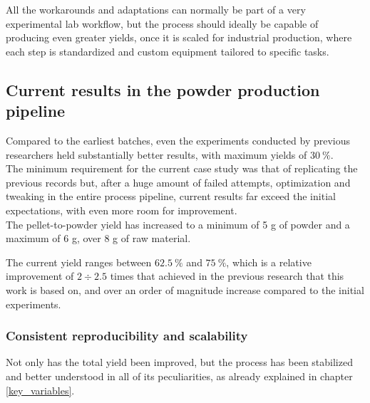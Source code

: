 \documentclass{article}
\begin{document}
        
        All the workarounds and adaptations can normally be part of a very experimental lab workflow, but the process should ideally 
        be capable of producing even greater yields, once it is scaled for industrial production, where each step is standardized 
        and custom equipment tailored to specific tasks. 

        \clearpage

        \subsection{Current results in the powder production pipeline \label{promising_results}}

        Compared to the earliest batches, even the experiments conducted by previous researchers held substantially better 
        results, with maximum yields of $30 \ \%$. \\ 

        The minimum requirement for the current case study was that of replicating the previous records but, after 
        a huge amount of failed attempts, optimization and tweaking in the entire process pipeline, current results 
        far exceed the initial expectations, with even more room for improvement. \\ 

        The pellet-to-powder yield has increased to a minimum of 5 g of powder and a maximum of 6 g, over 8 g of raw material. 

        The current yield ranges between $62.5 \ \%$ and $75 \ \%$, which is a relative improvement of $2 \div 2.5$ times that 
        achieved in the previous research that this work is based on, and over an order of magnitude increase compared to the 
        initial experiments. \\ 
%
%

        \subsubsection{Consistent reproducibility and scalability\label{consistent_reproducibility}}

        Not only has the total yield been improved, but the process has been stabilized and better understood in all of its 
        peculiarities, as already explained in chapter \ref{key_variables}. 
\end{document}
